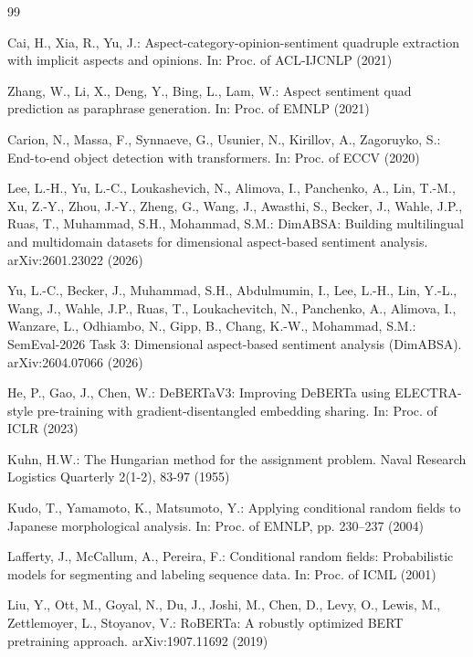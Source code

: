 \documentclass[runningheads]{llncs}
\begin{document}
\begin{thebibliography}{99}\small

Cai, H., Xia, R., Yu, J.:
Aspect-category-opinion-sentiment quadruple extraction with implicit
aspects and opinions. In: Proc. of ACL-IJCNLP (2021)

Zhang, W., Li, X., Deng, Y., Bing, L., Lam, W.:
Aspect sentiment quad prediction as paraphrase generation. In: Proc.
of EMNLP (2021)

Carion, N., Massa, F., Synnaeve, G., Usunier, N., Kirillov, A.,
Zagoruyko, S.:
End-to-end object detection with transformers. In: Proc. of ECCV
(2020)

Lee, L.-H., Yu, L.-C., Loukashevich, N., Alimova, I., Panchenko, A.,
Lin, T.-M., Xu, Z.-Y., Zhou, J.-Y., Zheng, G., Wang, J.,
Awasthi, S., Becker, J., Wahle, J.P., Ruas, T., Muhammad, S.H.,
Mohammad, S.M.:
DimABSA: Building multilingual and multidomain datasets for dimensional
aspect-based sentiment analysis. arXiv:2601.23022 (2026)

Yu, L.-C., Becker, J., Muhammad, S.H., Abdulmumin, I., Lee, L.-H.,
Lin, Y.-L., Wang, J., Wahle, J.P., Ruas, T., Loukachevitch, N.,
Panchenko, A., Alimova, I., Wanzare, L., Odhiambo, N., Gipp, B.,
Chang, K.-W., Mohammad, S.M.:
SemEval-2026 Task 3: Dimensional aspect-based sentiment analysis
(DimABSA). arXiv:2604.07066 (2026)

He, P., Gao, J., Chen, W.:
DeBERTaV3: Improving DeBERTa using ELECTRA-style pre-training with
gradient-disentangled embedding sharing. In: Proc. of ICLR (2023)

Kuhn, H.W.:
The Hungarian method for the assignment problem. Naval Research
Logistics Quarterly 2(1-2), 83-97 (1955)

Kudo, T., Yamamoto, K., Matsumoto, Y.:
Applying conditional random fields to Japanese morphological analysis.
In: Proc. of EMNLP, pp. 230--237 (2004)

Lafferty, J., McCallum, A., Pereira, F.:
Conditional random fields: Probabilistic models for segmenting and
labeling sequence data. In: Proc. of ICML (2001)

Liu, Y., Ott, M., Goyal, N., Du, J., Joshi, M., Chen, D., Levy, O.,
Lewis, M., Zettlemoyer, L., Stoyanov, V.:
RoBERTa: A robustly optimized BERT pretraining approach.
arXiv:1907.11692 (2019)


\end{thebibliography}
\end{document}
